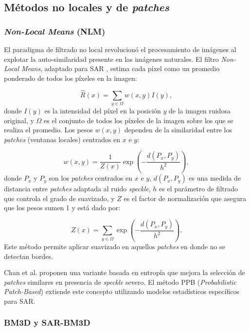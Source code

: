 \subsection{Métodos no locales y de \emph{patches}}

\subsubsection{\emph{Non-Local Means} (NLM)}

El paradigma de filtrado no local revolucionó el procesamiento de imágenes al explotar la auto-similaridad presente en las imágenes naturales. El filtro \emph{Non-Local Means}, adaptado para SAR \cite{deledalle2009iterative}, estima cada píxel como un promedio ponderado de todos los píxeles en la imagen:

\begin{equation}
	\hat{R}(x) = \sum_{y \in \Omega} w(x,y) I(y),
\end{equation}
donde $I(y)$ es la intensidad del píxel en la posición $y$ de la imagen ruidosa original, y $\Omega$ es el conjunto de todos los píxeles de la imagen sobre los que se realiza el promedio. Los pesos $w(x,y)$ dependen de la similaridad entre los \emph{patches} (ventanas locales) centrados en $x$ e $y$:

\begin{equation}
	w(x,y) = \frac{1}{Z(x)} \exp\left(-\frac{d(P_x, P_y)}{h^2}\right),
\end{equation}
donde $P_x$ y $P_y$ son los \emph{patches} centrados en $x$ e $y$, $d(P_x, P_y)$ es una medida de distancia entre \emph{patches} adaptada al ruido \emph{speckle}, $h$ es el parámetro de filtrado que controla el grado de suavizado, y $Z$ es el factor de normalización que asegura que los pesos sumen 1 y está dado por:

\begin{equation}
	Z(x) = \sum_{y \in \Omega} \exp\left(-\frac{d(P_x, P_y)}{h^2}\right).
\end{equation}
Este método permite aplicar suavizado en aquellos \emph{patches} en donde no se detectan bordes.

Chan et al. \cite{chan2022entropy} proponen una variante basada en entropía que mejora la selección de \emph{patches} similares en presencia de \emph{speckle} severo. El método PPB (\emph{Probabilistic Patch-Based}) \cite{deledalle2014exploiting} extiende este concepto utilizando modelos estadísticos específicos para SAR.

\subsubsection{BM3D y SAR-BM3D}

